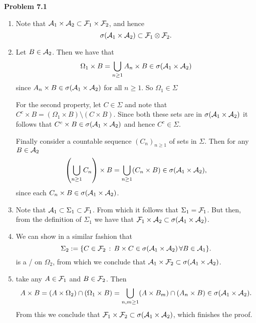    
\textbf{Problem 7.1}
\begin{enumerate}
\item Note that $\mathcal A_1 \times \mathcal A_2 \subset \mathcal F_1 \times \mathcal F_2$, and hence
\[
	\sigma(\mathcal A_1 \times \mathcal A_2) \subset \mathcal F_1 \otimes \mathcal F_2.
\]
\item Let $B \in \mathcal A_2$. Then we have that
\[
	\Omega_1 \times B = \bigcup_{n \ge 1} A_n \times B \in \sigma(\mathcal A_1 \times \mathcal A_2) 
\]
since $A_n \times B \in \sigma(\mathcal A_1 \times \mathcal A_2)$ for all $n \ge 1$. So $\Omega_1 \in \Sigma$

For the second property, let $C \in \Sigma$ and note that $C^c \times B = (\Omega_1 \times B) \setminus (C \times B)$.
Since both these sets are in $\sigma(\mathcal A_1 \times \mathcal A_2)$ it follows that $C^c \times B \in \sigma(\mathcal A_1 \times \mathcal A_2)$ and hence $C^c \in \Sigma$.

Finally consider a countable sequence $(C_n)_{n \ge 1}$ of sets in $\Sigma$. Then for any $B \in \mathcal A_2$
\[
	\left(\bigcup_{n \ge 1} C_n \right) \times B = \bigcup_{n \ge 1} (C_n \times B) \in \sigma(\mathcal A_1 \times \mathcal A_2),
\]
since each $C_n \times B \in \sigma(\mathcal A_1 \times \mathcal A_2)$.
\item Note that $\mathcal A_1 \subset \Sigma_1 \subset \mathcal F_1$. From which it follows that $\Sigma_1 = \mathcal F_1$. But then, from the definition of $\Sigma_1$ we have that $\mathcal F_1 \times \mathcal A_2 \subset \sigma(\mathcal A_1 \times \mathcal A_2)$.
\item We can show in a similar fashion that
\[
	\Sigma_2 := \{C \in \mathcal F_2 \, : \, B \times C \in \sigma(\mathcal A_1 \times \mathcal A_2) \, \forall B \in \mathcal A_1\}.
\]
is a \sigalg/ on $\Omega_2$, from which we conclude that $\mathcal A_1 \times \mathcal F_2 \subset \sigma(\mathcal A_1 \times \mathcal A_2)$.
\item take any $A \in \mathcal F_1$ and $B \in \mathcal F_2$. Then
\[
	A \times B = (A \times \Omega_2) \cap (\Omega_1 \times B) = \bigcup_{n,m \ge 1} (A \times B_m) \cap (A_n \times B) \in \sigma(\mathcal A_1 \times \mathcal A_2).
\]
From this we conclude that $\mathcal F_1 \times \mathcal F_2 \subset \sigma(\mathcal A_1 \times \mathcal A_2)$, which finishes the proof.
\end{enumerate}
